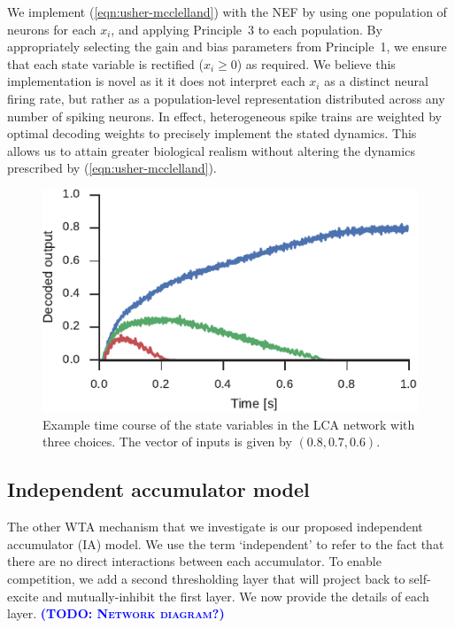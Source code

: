 \documentclass[10pt,letterpaper]{article}
\makeatletter
\newcommand{\todo}[1]{\textbf{\textsc{\textcolor{blue}{(TODO\@: #1)}}}}
\makeatother
\begin{document}
We implement (\ref{eqn:usher-mcclelland}) with the NEF by using one population of neurons for each $x_i$, and applying Principle~3 to each population.
By appropriately selecting the gain and bias parameters from Principle~1, we ensure that each state variable is rectified ($x_i \ge 0$) as required.
We believe this implementation is novel as it it does not interpret each $x_i$ as a distinct neural firing rate, but rather as a population-level representation distributed across any number of spiking neurons.
In effect, heterogeneous spike trains are weighted by optimal decoding weights to precisely implement the stated dynamics.
This allows us to attain greater biological realism without altering the dynamics prescribed by (\ref{eqn:usher-mcclelland}).

\begin{figure}
    \centering
    \includegraphics{figures/usher-mcclelland}
    \caption{ \label{fig:usher-mcclelland}
        Example time course of the state variables in the LCA network with three choices.
        The vector of inputs is given by $(0.8, 0.7, 0.6)$.
    }
\end{figure}

\subsection{Independent accumulator model}
The other WTA mechanism that we investigate is our proposed independent accumulator (IA) model.
We use the term `independent' to refer to the fact that there are no direct interactions between each accumulator.
To enable competition, we add a second thresholding layer that will project back to self-excite and mutually-inhibit the first layer.
We now provide the details of each layer.
\todo{Network diagram?}
\end{document}
